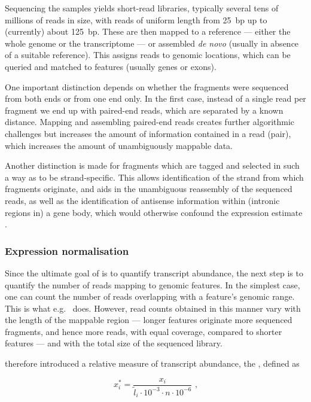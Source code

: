 Sequencing the \rnaseq samples yields short-read libraries, typically several
tens of millions of reads in size, with reads of uniform length from \SI{25}{bp}
up to (currently) about \SI{125}{bp}. These are then mapped to a reference ---
either the whole genome or the transcriptome --- or assembled \emph{de novo}
(usually in absence of a suitable reference). This assigns reads to genomic
locations, which can be queried and matched to features (usually genes or
exons).

One important distinction depends on whether the \cdna fragments were sequenced
from both ends or from one end only. In the first case, instead of a single read
per fragment we end up with paired-end reads, which are separated by a known
distance. Mapping and assembling paired-end reads creates further algorithmic
challenges but increases the amount of information contained in a read (pair),
which increases the amount of unambiguously mappable data.\todo[ref]{}

Another distinction is made for fragments which are tagged and selected in such
a way as to be strand-specific. This allows identification of the strand from
which fragments originate, and aids in the unambiguous reassembly of the
sequenced reads, as well as the identification of antisense information within
(intronic regions in) a gene body, which would otherwise confound the expression
estimate \citep{Parkhomchuk:2009}.

\subsubsection{Expression normalisation}

Since the ultimate goal of \rnaseq is to quantify transcript abundance, the next
step is to quantify the number of reads mapping to genomic features. In the
simplest case, one can count the number of reads overlapping with a feature’s
genomic range. This is what e.g.\  \citep{Anders:2014} does.
However, read counts obtained in this manner vary with the length of the
mappable region --- longer features originate more sequenced fragments, and
hence more reads, with equal coverage, compared to shorter features --- and with
the total size of the sequenced library.

\cite{Mortazavi:2008} therefore introduced a relative measure of transcript
abundance, the \rpkm, defined as

\begin{equation}
    x^*_i = \frac{x_i}{\tilde l_i \cdot 10^{-3} \cdot n \cdot 10^{-6}}
        \text{\ ,}
\end{equation}

